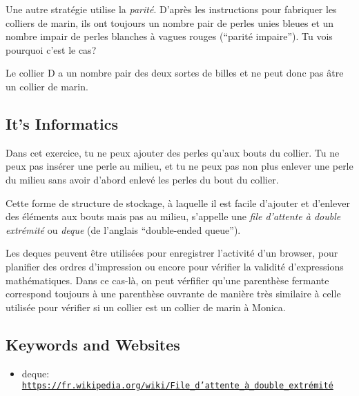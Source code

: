 \documentclass[a4paper,11pt]{report}
\newcommand{\BrochureUrlText}[1]{\texttt{#1}}
\begin{document}
Une autre stratégie utilise la \emph{parité}. D’après les instructions pour fabriquer les colliers de marin, ils ont toujours un nombre pair de perles unies bleues et un nombre impair de perles blanches à vagues rouges (“parité impaire”). Tu vois pourquoi c’est le cas?

Le collier D a un nombre pair des deux sortes de billes et ne peut donc pas âtre un collier de marin.


\subsection*{It’s Informatics}

Dans cet exercice, tu ne peux ajouter des perles qu’aux bouts du collier. Tu ne peux pas insérer une perle au milieu, et tu ne peux pas non plus enlever une perle du milieu sans avoir d’abord enlevé les perles du bout du collier.

Cette forme de structure de stockage, à laquelle il est facile d’ajouter et d’enlever des éléments aux bouts mais pas au milieu, s’appelle une \emph{file d’attente à double extrémité} ou \emph{deque} (de l’anglais “double-ended queue”).

Les deques peuvent être utilisées pour enregistrer l’activité d’un browser, pour planifier des ordres d’impression ou encore pour vérifier la validité d’expressions mathématiques. Dans ce cas-là, on peut vérfifier qu’une parenthèse fermante correspond toujours à une parenthèse ouvrante de manière très similaire à celle utilisée pour vérifier si un collier est un collier de marin à Monica.

{\raggedright

\subsection*{Keywords and Websites}

\begin{itemize}
  \item deque: \href{https://fr.wikipedia.org/wiki/File_d\%27attente_\%C3\%A0_double_extr\%C3\%A9mit\%C3\%A9}{\BrochureUrlText{https://fr.wikipedia.org/wiki/File\_d'attente\_à\_double\_extrémité}}
\end{itemize}


}
\end{document}
